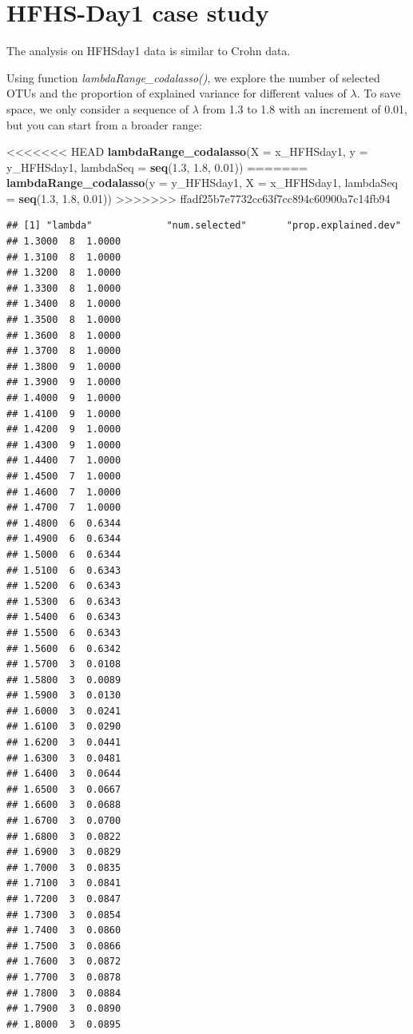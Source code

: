 \documentclass[openany]{book}
\newenvironment{Shaded}{\begin{snugshade}}{\end{snugshade}}
\newcommand{\KeywordTok}[1]{\textcolor[rgb]{0.13,0.29,0.53}{\textbf{#1}}}
\newcommand{\DataTypeTok}[1]{\textcolor[rgb]{0.13,0.29,0.53}{#1}}
\newcommand{\FloatTok}[1]{\textcolor[rgb]{0.00,0.00,0.81}{#1}}
\newcommand{\NormalTok}[1]{#1}
\begin{document}
\section{HFHS-Day1 case study}\label{hfhs-day1-case-study-2}

The analysis on HFHSday1 data is similar to Crohn data.

Using function \emph{lambdaRange\_codalasso()}, we explore the number of
selected OTUs and the proportion of explained variance for different
values of \(\lambda\). To save space, we only consider a sequence of
\(\lambda\) from 1.3 to 1.8 with an increment of 0.01, but you can start
from a broader range:

\begin{Shaded}
\begin{Highlighting}[]
<<<<<<< HEAD
\KeywordTok{lambdaRange_codalasso}\NormalTok{(}\DataTypeTok{X =}\NormalTok{ x_HFHSday1, }\DataTypeTok{y =}\NormalTok{ y_HFHSday1, }\DataTypeTok{lambdaSeq =} \KeywordTok{seq}\NormalTok{(}\FloatTok{1.3}\NormalTok{, }\FloatTok{1.8}\NormalTok{, }\FloatTok{0.01}\NormalTok{))}
=======
\KeywordTok{lambdaRange_codalasso}\NormalTok{(}\DataTypeTok{y =}\NormalTok{ y_HFHSday1, }\DataTypeTok{X =}\NormalTok{ x_HFHSday1, }\DataTypeTok{lambdaSeq =} \KeywordTok{seq}\NormalTok{(}\FloatTok{1.3}\NormalTok{, }\FloatTok{1.8}\NormalTok{, }\FloatTok{0.01}\NormalTok{))}
>>>>>>> ffadf25b7e7732cc63f7cc894c60900a7c14fb94
\end{Highlighting}
\end{Shaded}

\begin{verbatim}
## [1] "lambda"             "num.selected"       "prop.explained.dev"
## 1.3000  8  1.0000
## 1.3100  8  1.0000
## 1.3200  8  1.0000
## 1.3300  8  1.0000
## 1.3400  8  1.0000
## 1.3500  8  1.0000
## 1.3600  8  1.0000
## 1.3700  8  1.0000
## 1.3800  9  1.0000
## 1.3900  9  1.0000
## 1.4000  9  1.0000
## 1.4100  9  1.0000
## 1.4200  9  1.0000
## 1.4300  9  1.0000
## 1.4400  7  1.0000
## 1.4500  7  1.0000
## 1.4600  7  1.0000
## 1.4700  7  1.0000
## 1.4800  6  0.6344
## 1.4900  6  0.6344
## 1.5000  6  0.6344
## 1.5100  6  0.6343
## 1.5200  6  0.6343
## 1.5300  6  0.6343
## 1.5400  6  0.6343
## 1.5500  6  0.6343
## 1.5600  6  0.6342
## 1.5700  3  0.0108
## 1.5800  3  0.0089
## 1.5900  3  0.0130
## 1.6000  3  0.0241
## 1.6100  3  0.0290
## 1.6200  3  0.0441
## 1.6300  3  0.0481
## 1.6400  3  0.0644
## 1.6500  3  0.0667
## 1.6600  3  0.0688
## 1.6700  3  0.0700
## 1.6800  3  0.0822
## 1.6900  3  0.0829
## 1.7000  3  0.0835
## 1.7100  3  0.0841
## 1.7200  3  0.0847
## 1.7300  3  0.0854
## 1.7400  3  0.0860
## 1.7500  3  0.0866
## 1.7600  3  0.0872
## 1.7700  3  0.0878
## 1.7800  3  0.0884
## 1.7900  3  0.0890
## 1.8000  3  0.0895
\end{verbatim}
\end{document}

